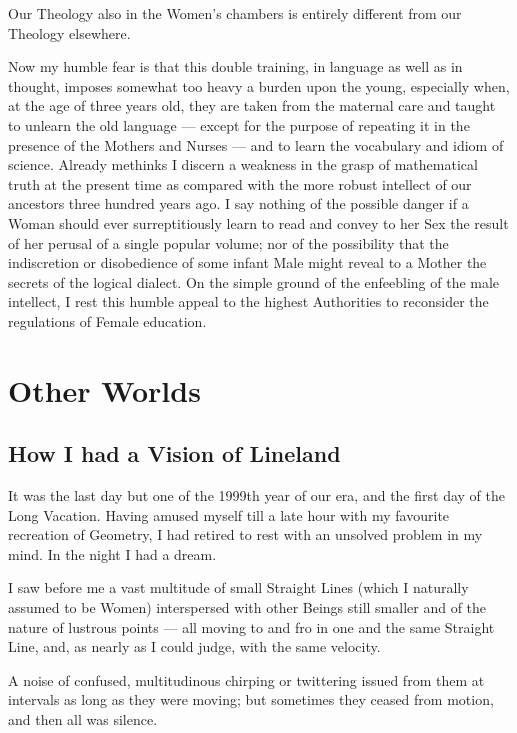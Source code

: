 \documentclass[12pt, a4paper, twoside]{memoir}
\begin{document}
Our Theology also in the Women's chambers is entirely different from our
Theology elsewhere.

Now my humble fear is that this double training, in language as well as in
thought, imposes somewhat too heavy a burden upon the young, especially when,
at the age of three years old, they are taken from the maternal care and
taught to unlearn the old language --- except for the purpose of repeating it in
the presence of the Mothers and Nurses --- and to learn the vocabulary and idiom
of science. Already methinks I discern a weakness in the grasp of mathematical
truth at the present time as compared with the more robust intellect of our
ancestors three hundred years ago. I say nothing of the possible danger if a
Woman should ever surreptitiously learn to read and convey to her Sex the
result of her perusal of a single popular volume; nor of the possibility that
the indiscretion or disobedience of some infant Male might reveal to a Mother
the secrets of the logical dialect. On the simple ground of the enfeebling of
the male intellect, I rest this humble appeal to the highest Authorities to
reconsider the regulations of Female education.




\part{Other Worlds}



\chapter{How I had a Vision of Lineland}
It was the last day but one of the 1999th year of our era, and the first day
of the Long Vacation. Having amused myself till a late hour with my favourite
recreation of Geometry, I had retired to rest with an unsolved problem in my
mind. In the night I had a dream.

I saw before me a vast multitude of small Straight Lines (which I naturally
assumed to be Women) interspersed with other Beings still smaller and of the
nature of lustrous points --- all moving to and fro in one and the same Straight
Line, and, as nearly as I could judge, with the same velocity.

A noise of confused, multitudinous chirping or twittering issued from them at
intervals as long as they were moving; but sometimes they ceased from motion,
and then all was silence.
\end{document}
